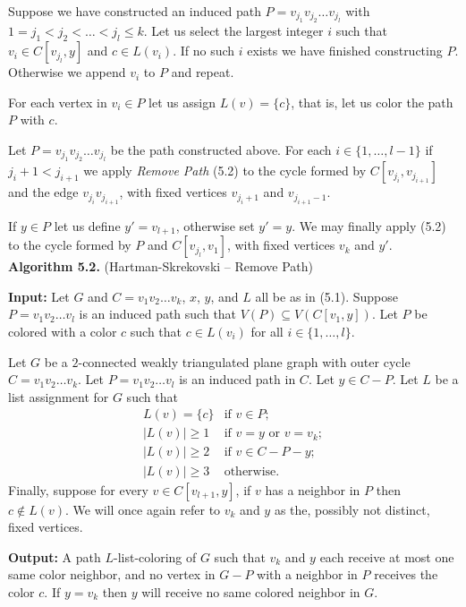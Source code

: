 \documentclass[letterpaper, 12pt]{amsart}
\theoremstyle{definition}
\theoremstyle{definition}
\theoremstyle{thm}
\theoremstyle{definition}
\begin{document}
Suppose we have constructed an induced path $P=v_{j_1}v_{j_2}\ldots v_{j_l}$
with $1=j_1<j_2<\ldots<j_l\le k$. Let us select the largest integer $i$ such that
$v_i\in C[v_{j_l},y]$ and $c\in L(v_i)$. If no such $i$ exists we have finished
constructing $P$. Otherwise we append $v_i$ to $P$ and repeat.

For each vertex in $v_i\in P$ let us assign $L(v)=\{c\}$, that is, let us color
the path $P$ with $c$.

Let $P=v_{j_1}v_{j_2}\ldots v_{j_l}$ be the path constructed above. For each
$i\in\{1,\ldots,l-1\}$ if $j_i+1<j_{i+1}$ we apply \textit{Remove Path} (5.2)
to the cycle formed by $C[v_{j_i},v_{j_{i+1}}]$ and the edge
$v_{j_i}v_{j_{i+1}}$, with fixed vertices $v_{j_i+1}$ and $v_{j_{i+1}-1}$.

If $y\in P$ let us define $y'=v_{l+1}$, otherwise set $y'=y$.
We may finally apply  (5.2) to the cycle formed by $P$ and
$C[v_{j_l},v_1]$, with fixed vertices $v_k$ and $y'$.\\

\noindent\textbf{Algorithm 5.2.} (Hartman-Skrekovski -- Remove Path)

\noindent\textbf{Input:} Let $G$ and $C=v_1v_2\ldots v_k$, $x$, $y$, and $L$ all
be as in (5.1). Suppose $P=v_1v_2\ldots v_l$ is an induced path such that $V(P)
\subseteq V(C[v_1,y])$. Let $P$ be colored with a
color $c$ such that $c\in L(v_i)$ for all $i\in\{1,\ldots,l\}$.

Let $G$ be a $2$-connected weakly triangulated plane
graph with outer cycle $C=v_1v_2\ldots v_k$. Let $P=v_1v_2\ldots v_l$ is an
induced path in $C$. Let $y\in C-P$. Let $L$ be a list
assignment for $G$ such that
\[
    \begin{array}{ll}
        L(v)=\{c\} & \text{if } v\in P;\\
	    |L(v)|\ge 1 & \text{if } v=y \text{ or } v=v_k;\\
	    |L(v)|\ge 2 & \text{if } v\in C-P-y;\\
	    |L(v)|\ge 3 & \text{otherwise.}
    \end{array}
\]
Finally, suppose for every $v\in C[v_{l+1},y]$, if $v$ has a
neighbor in $P$ then $c\not\in L(v)$.
We will once again refer to $v_k$ and $y$ as the, possibly not distinct, fixed
vertices.

\noindent\textbf{Output:} A path $L$-list-coloring of $G$ such that $v_k$ and
$y$ each receive at most one same color neighbor, and no vertex in
$G-P$ with a neighbor in $P$ receives the color $c$. If $y=v_k$ then $y$ will
receive no same colored neighbor in $G$.
\end{document}
